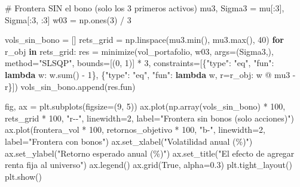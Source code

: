 \documentclass[
  spanish,
  letterpaper,
  DIV=11,
  numbers=noendperiod]{scrreprt}
\newenvironment{Shaded}{\begin{snugshade}}{\end{snugshade}}
\newcommand{\BuiltInTok}[1]{\textcolor[rgb]{0.00,0.23,0.31}{#1}}
\newcommand{\CommentTok}[1]{\textcolor[rgb]{0.37,0.37,0.37}{#1}}
\newcommand{\ControlFlowTok}[1]{\textcolor[rgb]{0.00,0.23,0.31}{\textbf{#1}}}
\newcommand{\DecValTok}[1]{\textcolor[rgb]{0.68,0.00,0.00}{#1}}
\newcommand{\FloatTok}[1]{\textcolor[rgb]{0.68,0.00,0.00}{#1}}
\newcommand{\KeywordTok}[1]{\textcolor[rgb]{0.00,0.23,0.31}{\textbf{#1}}}
\newcommand{\NormalTok}[1]{\textcolor[rgb]{0.00,0.23,0.31}{#1}}
\newcommand{\OperatorTok}[1]{\textcolor[rgb]{0.37,0.37,0.37}{#1}}
\newcommand{\StringTok}[1]{\textcolor[rgb]{0.13,0.47,0.30}{#1}}
\newcommand{\VariableTok}[1]{\textcolor[rgb]{0.07,0.07,0.07}{#1}}
\begin{document}
\begin{Shaded}
\begin{Highlighting}[]
\CommentTok{\# Frontera SIN el bono (solo los 3 primeros activos)}
\NormalTok{mu3, Sigma3 }\OperatorTok{=}\NormalTok{ mu[:}\DecValTok{3}\NormalTok{], Sigma[:}\DecValTok{3}\NormalTok{, :}\DecValTok{3}\NormalTok{]}
\NormalTok{w03 }\OperatorTok{=}\NormalTok{ np.ones(}\DecValTok{3}\NormalTok{) }\OperatorTok{/} \DecValTok{3}

\NormalTok{vols\_sin\_bono }\OperatorTok{=}\NormalTok{ []}
\NormalTok{rets\_grid }\OperatorTok{=}\NormalTok{ np.linspace(mu3.}\BuiltInTok{min}\NormalTok{(), mu3.}\BuiltInTok{max}\NormalTok{(), }\DecValTok{40}\NormalTok{)}
\ControlFlowTok{for}\NormalTok{ r\_obj }\KeywordTok{in}\NormalTok{ rets\_grid:}
\NormalTok{    res }\OperatorTok{=}\NormalTok{ minimize(vol\_portafolio, w03, args}\OperatorTok{=}\NormalTok{(Sigma3,), method}\OperatorTok{=}\StringTok{"SLSQP"}\NormalTok{,}
\NormalTok{                   bounds}\OperatorTok{=}\NormalTok{[(}\DecValTok{0}\NormalTok{, }\DecValTok{1}\NormalTok{)] }\OperatorTok{*} \DecValTok{3}\NormalTok{,}
\NormalTok{                   constraints}\OperatorTok{=}\NormalTok{[\{}\StringTok{"type"}\NormalTok{: }\StringTok{"eq"}\NormalTok{, }\StringTok{"fun"}\NormalTok{: }\KeywordTok{lambda}\NormalTok{ w: w.}\BuiltInTok{sum}\NormalTok{() }\OperatorTok{{-}} \DecValTok{1}\NormalTok{\},}
\NormalTok{                                \{}\StringTok{"type"}\NormalTok{: }\StringTok{"eq"}\NormalTok{, }\StringTok{"fun"}\NormalTok{: }\KeywordTok{lambda}\NormalTok{ w, r}\OperatorTok{=}\NormalTok{r\_obj: w }\OperatorTok{@}\NormalTok{ mu3 }\OperatorTok{{-}}\NormalTok{ r\}])}
\NormalTok{    vols\_sin\_bono.append(res.fun)}

\NormalTok{fig, ax }\OperatorTok{=}\NormalTok{ plt.subplots(figsize}\OperatorTok{=}\NormalTok{(}\DecValTok{9}\NormalTok{, }\DecValTok{5}\NormalTok{))}
\NormalTok{ax.plot(np.array(vols\_sin\_bono) }\OperatorTok{*} \DecValTok{100}\NormalTok{, rets\_grid }\OperatorTok{*} \DecValTok{100}\NormalTok{, }\StringTok{"r{-}{-}"}\NormalTok{, linewidth}\OperatorTok{=}\DecValTok{2}\NormalTok{,}
\NormalTok{        label}\OperatorTok{=}\StringTok{"Frontera sin bonos (solo acciones)"}\NormalTok{)}
\NormalTok{ax.plot(frontera\_vol }\OperatorTok{*} \DecValTok{100}\NormalTok{, retornos\_objetivo }\OperatorTok{*} \DecValTok{100}\NormalTok{, }\StringTok{"b{-}"}\NormalTok{, linewidth}\OperatorTok{=}\DecValTok{2}\NormalTok{,}
\NormalTok{        label}\OperatorTok{=}\StringTok{"Frontera con bonos"}\NormalTok{)}
\NormalTok{ax.set\_xlabel(}\StringTok{"Volatilidad anual (\%)"}\NormalTok{)}
\NormalTok{ax.set\_ylabel(}\StringTok{"Retorno esperado anual (\%)"}\NormalTok{)}
\NormalTok{ax.set\_title(}\StringTok{"El efecto de agregar renta fija al universo"}\NormalTok{)}
\NormalTok{ax.legend()}
\NormalTok{ax.grid(}\VariableTok{True}\NormalTok{, alpha}\OperatorTok{=}\FloatTok{0.3}\NormalTok{)}
\NormalTok{plt.tight\_layout()}
\NormalTok{plt.show()}
\end{Highlighting}
\end{Shaded}
\end{document}
